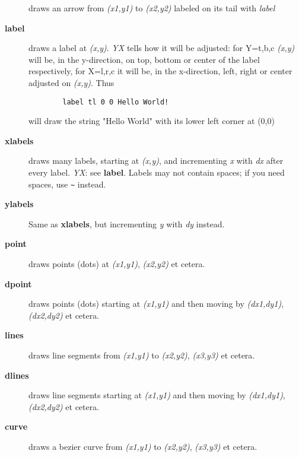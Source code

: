 \documentclass[a4paper,twocolumn]{article}
\begin{document}
\begin{description}
draws an arrow from \textit{(x1,y1)} to \textit{(x2,y2)} labeled on its tail with
\textit{label}

\item[{\textbf{label}}] 

draws a label at \textit{(x,y)}. \textit{YX} tells how it will be adjusted: for
Y=t,b,c \textit{(x,y)} will be, in the y-direction, on top, bottom or center
of the label respectively, for X=l,r,c it will be, in the x-direction,
left, right or center adjusted on \textit{(x,y)}. Thus

\begin{verbatim}
        label tl 0 0 Hello World!
\end{verbatim}

will draw the string "Hello World"  with its lower left corner at (0,0)

\item[{\textbf{xlabels}}] 

draws many labels, starting at \textit{(x,y)}, and incrementing \textit{x} with \textit{dx}
after every label. \textit{YX}: see \textbf{label}. Labels may not contain spaces;
if you need spaces, use \texttt{\~{}} instead.

\item[{\textbf{ylabels}}] 

Same as \textbf{xlabels}, but incrementing \textit{y} with \textit{dy} instead.

\item[{\textbf{point}}] 

draws points (dots) at \textit{(x1,y1)}, \textit{(x2,y2)} et cetera.

\item[{\textbf{dpoint}}] 

draws points (dots) starting at \textit{(x1,y1)} and then moving by 
\textit{(dx1,dy1)}, \textit{(dx2,dy2)} et cetera.

\item[{\textbf{lines}}] 

draws line segments from \textit{(x1,y1)} to \textit{(x2,y2)}, \textit{(x3,y3)} et cetera.

\item[{\textbf{dlines}}] 

draws line segments starting at \textit{(x1,y1)} and then moving by 
\textit{(dx1,dy1)}, \textit{(dx2,dy2)} et cetera.

\item[{\textbf{curve}}] 

draws a bezier curve from \textit{(x1,y1)} to \textit{(x2,y2)}, \textit{(x3,y3)} et cetera.


\end{description}
\end{document}
